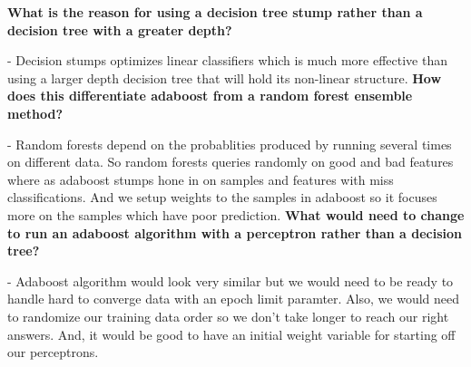 \documentclass{exam}
\begin{document}
\vspace{5mm}

\vspace{5mm}
\begin{questions}

\question\textbf{What is the reason for using a decision tree stump rather than a decision tree with a greater depth?}
\par\normalfont 
- Decision stumps optimizes linear classifiers which is much more
effective than using a larger depth decision tree that will hold its non-linear structure. 
\question\textbf{How does this differentiate adaboost from a random forest ensemble method?}
\par\normalfont 
- Random forests depend on the probablities produced by running
several times on different data. So random forests queries randomly on good and bad features where as adaboost stumps hone in on samples and features with miss classifications. And we setup weights to the samples in adaboost so it focuses more on the samples which have poor prediction.
\question\textbf{What would need to change to run an adaboost algorithm with a perceptron rather than a decision tree?}
\par\normalfont 
- Adaboost algorithm would look very similar but we would need to be ready to handle hard to converge data with an epoch limit paramter. Also, we would need to randomize our training data order so we don't take longer to reach our right answers. And, it would be good to have an initial weight variable for starting off our perceptrons.

\end{questions}
\clearpage
\end{document}
